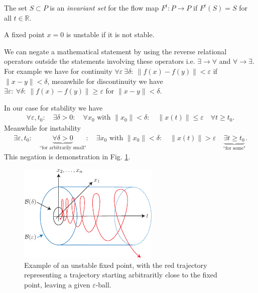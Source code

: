 \begin{definition}
	The set $S \subset P$ is an \emph{invariant set} for the flow map $F^{t}:P \to P$ if $F^{t}(S) =S$ for all $t \in \mathbb{R}$.
\end{definition}

\begin{definition}
	A fixed point $ {x}=0$ is unstable if it is not stable.
\end{definition}

\begin{remark}[]
	We can negate a mathematical statement by using the reverse relational operators outside the statements involving these operators i.e. $ \exists \to \forall $ and $\forall \to \exists $. For example we have for continuity $\forall \varepsilon\ \exists \delta:\  \|f( {x}) - f( {y}) \| < \varepsilon$ if $ \| {x}- {y} \|<\delta$, meanwhile for discontinuity we have  $\exists \varepsilon:\ \forall \delta:\  \|f( {x}) - f( {y}) \| \geq  \varepsilon$ for $ \| {x}- {y} \|< \delta$.

	In our case for stability we have
	\begin{align}
		\forall \varepsilon,t_0: \quad \exists \delta>0: \quad \forall  {x}_0  \textrm{ with }  \| {x}_0 \| < \delta: \quad  \| {x}(t) \|\leq \varepsilon \quad \forall t\geq t_0.
	\end{align}
Meanwhile for instability 
\begin{align}
	\exists \varepsilon,t_0:\quad \underbrace{\forall \delta>0}_{ \textrm{``for arbitrarily small"} }:\quad \exists  {x}_0  \textrm{ with }  \| {x}_0 \|<\delta: \quad  \| {x}(t) \|>\varepsilon \quad \underbrace{\exists t\geq t_0}_{ \textrm{``for some"} }.
\end{align}
This negation is demonstration in Fig. \ref{fig:instable_def}.
\begin{figure}[h!]
	\centering
	\includegraphics[width=0.6\textwidth]{figures/ch2/6unstable_def.pdf}
	\caption{Example of an unstable fixed point, with the red trajectory representing a trajectory starting arbitraritly close to the fixed point, leaving a given $\varepsilon$-ball.}
	\label{fig:instable_def}
\end{figure}
\end{remark}

